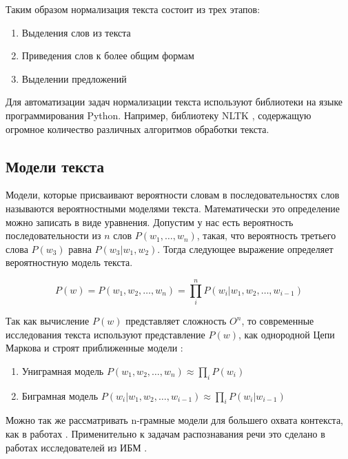 Таким образом нормализация текста состоит из трех этапов: 
\begin{enumerate}
\tightlist
\item Выделения слов из текста
\item Приведения слов к более общим формам 
\item Выделении предложений 
\end{enumerate}

Для автоматизации задач нормализации текста используют библиотеки на языке программирования Python. Например, библиотеку NLTK \cite{bird2009natural}, содержащую огромное количество различных алгоритмов обработки текста.

\subsection{Модели текста}
\label{sec:textmodel}
Модели, которые присваивают вероятности словам в последовательностях слов называются вероятностными моделями текста. Математически это определение можно записать в виде уравнения. 
Допустим у нас есть вероятность последовательности из $n$ слов $ P(w_1, \dots, w_n)$, такая, что вероятность третьего слова $P(w_3) $ равна $P(w_3|w_1,w_2)$. 
Тогда следующее выражение определяет вероятностную модель текста. 

\begin{defi} 
\label{defi:rev1}
$$P( w ) = P( w_1, w_2, \dots , w_n ) =  \prod_i^n P( w_i | w_1, w_2, \dots , w_{i-1} )$$
\end{defi}

Так как вычисление $P (w) $ представляет сложность $O^n$, то современные исследования текста используют представление $P ( w )$, как однородной Цепи Маркова и строят приближенные модели \cite{schwenk2002connectionist}: 

\begin{enumerate}
\tightlist
\item Униграмная модель $ P(w_1, w_2, \dots , w_n )  \approx \prod_i P(w_i)$
\item Биграмная модель $ P(w_i \vert w_1, w_2, \dots , w_{i-1} )  \approx  \prod_i P(w_i \vert w_{i-1} )$
\end{enumerate}

Можно так же рассматривать n-грамные модели для большего охвата контекста, как в работах \cite{teahan1996entropy, teahan1997models}. Применительно к задачам распознавания речи это сделано в работах исследователей из ИБМ \cite{bahl1983maximum, bahl1986maximum, averbuch1987experiments}.

